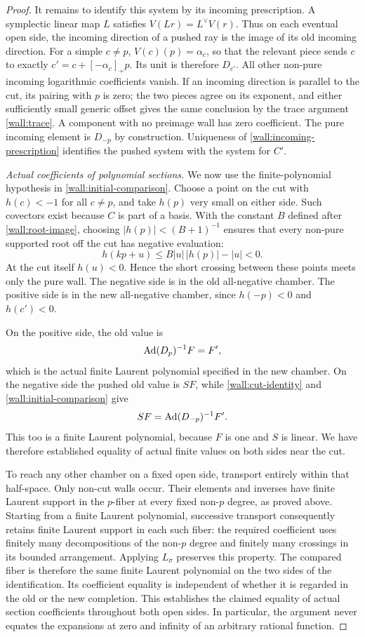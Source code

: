 \begin{proof}
It remains to identify this system by its incoming
prescription.  A symplectic linear map $L$ satisfies
$V(Lr)=L^\vee V(r)$.  Thus on each eventual open side,
the incoming direction of a pushed ray is the image
of its old incoming direction.  For a simple $c\ne p$,
$V(c)(p)=\alpha_c$, so that the relevant piece sends
$c$ to exactly $c'=c+[-\alpha_c]_+p$.  Its unit is
therefore $D_{c'}$.  All other non-pure incoming
logarithmic coefficients vanish.  If an incoming
direction is parallel to the cut, its pairing with
$p$ is zero; the two pieces agree on its exponent,
and either sufficiently small generic offset gives
the same conclusion by the trace argument
\eqref{wall:trace}.  A component with no preimage
wall has zero coefficient.  The pure incoming
element is $D_{-p}$ by construction.  Uniqueness of
\eqref{wall:incoming-prescription} identifies the
pushed system with the system for $C'$.

\emph{Actual coefficients of polynomial sections.}
We now use the finite-polynomial hypothesis in
\eqref{wall:initial-comparison}.  Choose a point on
the cut with $h(c)<-1$ for all $c\ne p$, and take
$h(p)$ very small on either side.  Such covectors
exist because $C$ is part of a basis.  With the
constant $B$ defined after
\eqref{wall:root-image}, choosing
$|h(p)|<(B+1)^{-1}$ ensures that every non-pure
supported root off the cut has negative evaluation:
\[
 h(kp+u)\le B|u|\,|h(p)|-|u|<0.
\]
At the cut itself $h(u)<0$.  Hence the short
crossing between these points meets only the pure
wall.  The negative side is in the old all-negative
chamber.  The positive side is in the new
all-negative chamber, since $h(-p)<0$ and
$h(c')<0$.

On the positive side, the old value is
\[
 \operatorname{Ad}(D_p)^{-1}F=F',
\]
which is the actual finite Laurent polynomial
specified in the new chamber.  On the negative
side the pushed old value is $SF$, while
\eqref{wall:cut-identity} and
\eqref{wall:initial-comparison} give
\[
 SF=\operatorname{Ad}(D_{-p})^{-1}F'.
\]
This too is a finite Laurent polynomial, because
$F$ is one and $S$ is linear.  We have therefore
established equality of actual finite values on
both sides near the cut.

To reach any other chamber on a fixed open side,
transport entirely within that half-space.
Only non-cut walls occur.  Their elements and
inverses have finite Laurent support in the
$p$-fiber at every fixed non-$p$ degree, as proved
above.  Starting from a finite Laurent polynomial,
successive transport consequently retains finite
Laurent support in each such fiber: the required
coefficient uses finitely many decompositions of
the non-$p$ degree and finitely many crossings in
its bounded arrangement.  Applying $L_\sigma$
preserves this property.  The compared fiber is
therefore the same finite Laurent polynomial on
the two sides of the identification.  Its
coefficient equality is independent of whether
it is regarded in the old or the new completion.
This establishes the claimed equality of actual
section coefficients throughout both open
sides.  In particular, the argument never
equates the expansions at zero and infinity
of an arbitrary rational function.


\end{proof}
